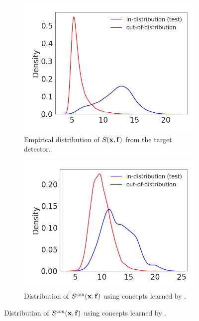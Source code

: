 \begin{figure}
  \centering
  \begin{subfigure}{0.32\linewidth}
    \includegraphics[width=\textwidth]{figures/distr_energy_target.png}
    \caption{\small Empirical distribution of $S(\mathbf{x}, \mathbf{f})$ from the target detector.}
    \label{fig:short-a1}
  \end{subfigure}
  \hfill
  \begin{subfigure}{0.32\linewidth}
    \includegraphics[width=\textwidth]{figures/distr_energy_yeh.png}
    \caption{\small Distribution of $S^{\textrm{con}}(\mathbf{x}, \mathbf{f})$ using concepts learned by \citet{yeh2020completeness}.}
    \label{fig:short-b1}
  \end{subfigure}

\end{figure}
